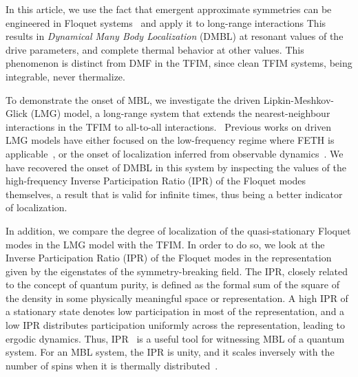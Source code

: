 \documentclass[%
reprint,
superscriptaddress,
amsmath,amssymb,
aps,
prb,
showkeys,
]{revtex4-2}
\begin{document}
	
	In this article, {we use the fact that emergent approximate symmetries can be engineered in Floquet systems~\cite{Engelhardt2013,asmi:scars} and apply it to long-range interactions This results in \textit{Dynamical Many Body Localization} (DMBL) at resonant values of the drive parameters}, and complete thermal behavior at other values. This phenomenon is distinct from DMF in the TFIM, since clean TFIM systems, being integrable, never thermalize.
	
	To demonstrate the onset of MBL, we investigate the driven Lipkin-Meshkov-Glick (LMG) model\cite{lmg1965_1,lmg1965_2, lmg1965_3, debergh_2001, ribeiro2008,Engelhardt2013,titum2020}, a long-range system {that extends the nearest-neighbour interactions in the TFIM to  all-to-all interactions.}~\cite{campa_statistical_2009, eisele_multiple_1988, canning_class_1992} Previous works on driven LMG models have either focused on the low-frequency regime where FETH is applicable~\cite{russomanno_thermalization_2015}, or the onset of localization inferred from observable dynamics~\cite{Engelhardt2013, lmg:fidelity, Russomanno2017}.  We have recovered the onset of DMBL in this system by inspecting the values of the high-frequency Inverse Participation Ratio (IPR) of the Floquet modes themselves, a result that is valid for infinite times, thus being a better indicator of localization.
	
	In addition, we compare the degree of localization of the quasi-stationary Floquet modes {in the LMG model with the TFIM}. In order to do so, we look at the Inverse Participation Ratio (IPR) of the Floquet modes in the representation given by the eigenstates of the symmetry-breaking field. The IPR, closely related to the concept of quantum purity, is defined as the formal sum of the square of the density in some physically meaningful space or representation. A high IPR of a stationary state denotes low participation in most of the representation, and a low IPR distributes participation uniformly across the representation, leading to ergodic dynamics\cite{vu_fermionic_2022}. Thus, IPR~\cite{Misguich2016} is a useful tool for witnessing MBL of a quantum system. For an MBL system, the IPR is unity, and it scales inversely with the {number of spins} when it is thermally distributed~\cite{calixto_inverse_2015}.
	
\end{document}
